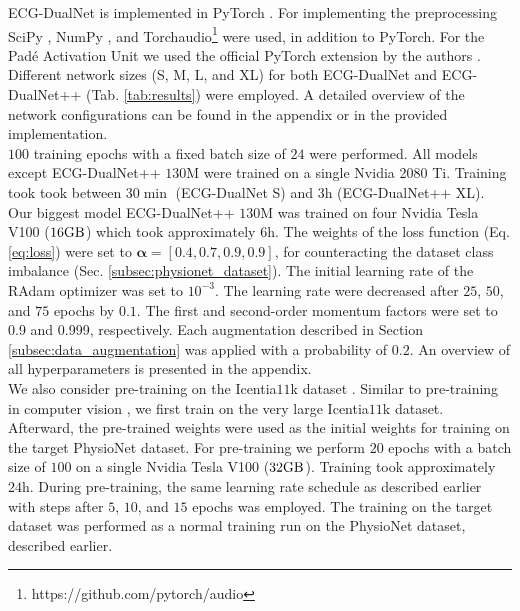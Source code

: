 ECG-DualNet is implemented in PyTorch \cite{Paszke2019}. For implementing the preprocessing SciPy \cite{Virtanen2020}, NumPy \cite{Harris2020}, and Torchaudio\footnote{https://github.com/pytorch/audio} were used, in addition to PyTorch. For the Pad\'{e} Activation Unit we used the official PyTorch extension by the authors \cite{Molina2020}.\\
\indent Different network sizes (S, M, L, and XL) for both ECG-DualNet and ECG-DualNet++ (Tab. \ref{tab:results}) were employed. A detailed overview of the network configurations can be found in the appendix or in the provided implementation.\\
\indent $100$ training epochs with a fixed batch size of $24$ were performed. All models except ECG-DualNet++ $130\si{\mega}$ were trained on a single Nvidia 2080 Ti. Training took took between $30\si{\min}$ (ECG-DualNet S) and $3\si{\hour}$ (ECG-DualNet++ XL). Our biggest model ECG-DualNet++ $130\si{\mega}$ was trained on four Nvidia Tesla V100 ($16\si{\giga\byte}$) which took approximately $6\si{\hour}$. The weights of the loss function (Eq. \ref{eq:loss}) were set to $\mathbf{\alpha}=[0.4, 0.7, 0.9, 0.9]$, for counteracting the dataset class imbalance (Sec. \ref{subsec:physionet_dataset}). The initial learning rate of the RAdam optimizer was set to $10^{-3}$. The learning rate were decreased after $25$, $50$, and $75$ epochs by $0.1$. The first and second-order momentum factors were set to 0.9 and 0.999, respectively. Each augmentation described in Section \ref{subsec:data_augmentation} was applied with a probability of $0.2$. An overview of all hyperparameters is presented in the appendix.\\
We also consider pre-training on the Icentia$11$k dataset \cite{Tan2019}. Similar to pre-training in computer vision \cite{Zeiler2014, Girshick2014, He2019}, we first train on the very large Icentia$11$k dataset. Afterward, the pre-trained weights were used as the initial weights for training on the target PhysioNet dataset. For pre-training we perform $20$ epochs with a batch size of $100$ on a single Nvidia Tesla V100 ($32\si{\giga \byte}$). Training took approximately $24\si{\hour}$. During pre-training, the same learning rate schedule as described earlier with steps after $5$, $10$, and $15$ epochs was employed. The training on the target dataset was performed as a normal training run on the PhysioNet dataset, described earlier.

